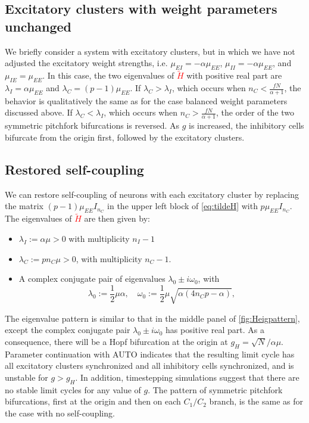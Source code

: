 \documentclass[reqno]{siamonline190516}
\newcommand{\revised}[1]{ \textcolor{red}{#1} }
\begin{document}
\subsection{Excitatory clusters with weight parameters unchanged}

We briefly consider a system with excitatory clusters, but in which we have not adjusted the excitatory weight strengths, i.e. $\mu_{EI} = -\alpha \mu_{EE}$, $\mu_{II} = -\alpha \mu_{EE}$, and $\mu_{IE} = \mu_{EE}$. In this case, the two eigenvalues of \revised{$\tilde{H}$} with positive real part are $\lambda_I = \alpha \mu_{EE}$ and $\lambda_C = (p-1)\mu_{EE}$. If $\lambda_C > \lambda_I$, which occurs when $n_C < \frac{f N}{\alpha+1}$, the behavior is qualitatively the same as for the case balanced weight parameters discussed above. If  $\lambda_C < \lambda_I$, which occurs when $n_C > \frac{f N}{\alpha+1}$, the order of the two symmetric pitchfork bifurcations is reversed. As $g$ is increased, the inhibitory cells bifurcate from the origin first, followed by the excitatory clusters.

\subsection{Restored self-coupling} \label{sec:restore_selfCoup_Eclusters}
We can restore self-coupling of neurons with each excitatory cluster by replacing the matrix $(p-1) \mu_{EE} I_{n_C}$ in the upper left block of \cref{eq:tildeH} with $p \mu_{EE} I_{n_C}$. The eigenvalues of \revised{$\tilde{H}$} are then given by:
\begin{itemize}
\item $\lambda_I := \alpha \mu > 0$ with multiplicity $n_I - 1$
\item $\lambda_C := p n_C \mu > 0$, with multiplicity $n_C - 1$.
\item A complex conjugate pair of eigenvalues $\lambda_0 \pm i \omega_0$, with 
\begin{equation*}
    \lambda_0 := \frac{1}{2}\mu \alpha, \quad 
    \omega_0 := \frac{1}{2}\mu \sqrt{ \alpha( 4 n_C p - \alpha ) },
\end{equation*}
\end{itemize}
The eigenvalue pattern is similar to that in the middle panel of \cref{fig:Heigpattern}, except the complex conjugate pair $\lambda_0 \pm i \omega_0$ has positive real part. As a consequence, there will be a Hopf bifurcation at the origin at $g_H = \sqrt{N}/\alpha \mu$. Parameter continuation with AUTO indicates that the resulting limit cycle has all excitatory clusters synchronized and all inhibitory cells synchronized, and is unstable for $g > g_H$. In addition, timestepping simulations suggest that there are no stable limit cycles for any value of $g$. The pattern of symmetric pitchfork bifurcations, first at the origin and then on each $C_1/C_2$ branch, is the same as for the case with no self-coupling.
\end{document}
